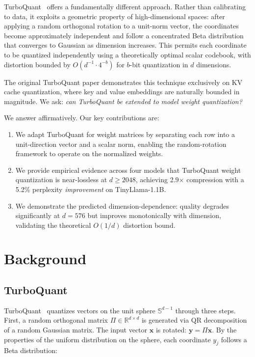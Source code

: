 \documentclass[11pt,twocolumn,letterpaper]{article}
\begin{document}
TurboQuant~\cite{daliri2025turboquant} offers a fundamentally different approach. Rather than calibrating to data, it exploits a geometric property of high-dimensional spaces: after applying a random orthogonal rotation to a unit-norm vector, the coordinates become approximately independent and follow a concentrated Beta distribution that converges to Gaussian as dimension increases. This permits each coordinate to be quantized independently using a theoretically optimal scalar codebook, with distortion bounded by $O(d^{-1} \cdot 4^{-b})$ for $b$-bit quantization in $d$ dimensions.

The original TurboQuant paper demonstrates this technique exclusively on KV cache quantization, where key and value embeddings are naturally bounded in magnitude. We ask: \textit{can TurboQuant be extended to model weight quantization?}

We answer affirmatively. Our key contributions are:

\begin{enumerate}
\item We adapt TurboQuant for weight matrices by separating each row into a unit-direction vector and a scalar norm, enabling the random-rotation framework to operate on the normalized weights.
\item We provide empirical evidence across four models that TurboQuant weight quantization is near-lossless at $d \geq 2048$, achieving 2.9$\times$ compression with a 5.2\% perplexity \textit{improvement} on TinyLlama-1.1B.
\item We demonstrate the predicted dimension-dependence: quality degrades significantly at $d = 576$ but improves monotonically with dimension, validating the theoretical $O(1/d)$ distortion bound.
\end{enumerate}

\section{Background}

\subsection{TurboQuant}

TurboQuant~\cite{daliri2025turboquant} quantizes vectors on the unit sphere $\mathbb{S}^{d-1}$ through three steps. First, a random orthogonal matrix $\Pi \in \mathbb{R}^{d \times d}$ is generated via QR decomposition of a random Gaussian matrix. The input vector $\mathbf{x}$ is rotated: $\mathbf{y} = \Pi\mathbf{x}$. By the properties of the uniform distribution on the sphere, each coordinate $y_j$ follows a Beta distribution:
\end{document}
